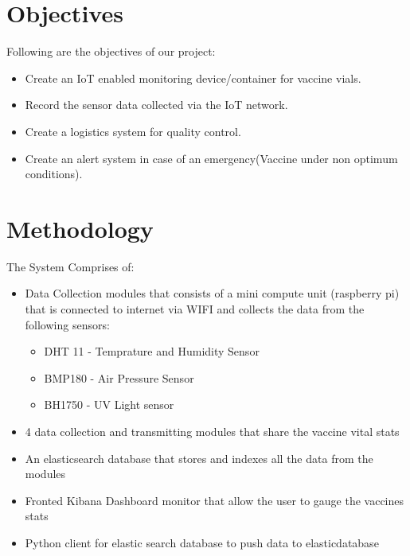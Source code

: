 \section{Objectives}

Following are the objectives of our project:
\begin{itemize}
    \item Create an IoT enabled  monitoring device/container for vaccine vials.
    \item Record the sensor data collected via the IoT network.
    \item Create a logistics system for quality control.
    \item Create an alert system in case of an emergency(Vaccine under non optimum conditions).
\end{itemize}

\section{Methodology}

The System Comprises of:
\begin{itemize}
    \item Data Collection modules that consists of a mini compute unit
        (raspberry pi) that is connected to internet via WIFI and collects the
        data from the following sensors:
        \begin{itemize}
            \item DHT 11 - Temprature and Humidity Sensor
            \item BMP180 - Air Pressure Sensor
            \item BH1750 - UV Light sensor
        \end{itemize}
    \item 4 data collection and transmitting modules that share the vaccine
        vital stats
    \item An elasticsearch database that stores and indexes all the data from
        the modules
    \item Fronted Kibana Dashboard monitor that allow the user to gauge the
        vaccines stats
    \item Python client for elastic search database to push data to
        elasticdatabase
\end{itemize}

